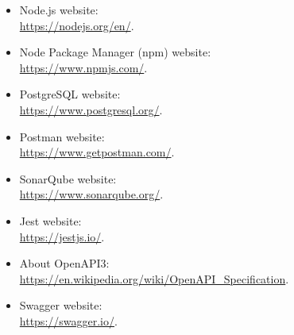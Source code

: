 \begin{itemize}
	\item Node.js website:\\
	\url{https://nodejs.org/en/}.
	
	\item Node Package Manager (npm) website:\\
	\url{https://www.npmjs.com/}.
	
	\item PostgreSQL website:\\
	\url{https://www.postgresql.org/}.
	
	\item Postman website:\\
	\url{https://www.getpostman.com/}.
	
	\item SonarQube website:\\
	\url{https://www.sonarqube.org/}.
	
	\item Jest website:\\
	\url{https://jestjs.io/}.
	
	\item About OpenAPI3:\\
	\url{https://en.wikipedia.org/wiki/OpenAPI_Specification}.

	\item Swagger website:\\
	\url{https://swagger.io/}.
\end{itemize}
